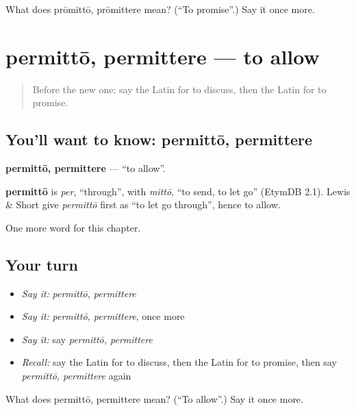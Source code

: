 \begin{tcolorbox}[breakable,colback=teal!4,colframe=teal!35!black,title={Before you move on}]
What does prōmittō, prōmittere mean? (\textquotedblleft{}To promise\textquotedblright{}.) Say it once more.
\end{tcolorbox}
\section[permittō, permittere]{permittō, permittere — to allow}

\label{lesson:LA-C166-permitto}



\begin{quote}
Before the new one: say the Latin for to discuss, then the Latin for to promise.
\end{quote}

\subsection*{You'll want to know: permittō, permittere}
\textbf{permittō, permittere} — \textquotedblleft{}to allow\textquotedblright{}.

\begin{cousinweb}
\textbf{permittō} is \emph{per}, \textquotedblleft{}through\textquotedblright{}, with \emph{mittō}, \textquotedblleft{}to send, to let go\textquotedblright{} (EtymDB 2.1). Lewis \& Short give \emph{permittō} first as \textquotedblleft{}to let go through\textquotedblright{}, hence to allow.
\end{cousinweb}

\begin{grammarlens}[title={What you've built}]
One more word for this chapter.
\end{grammarlens}

\subsection*{Your turn}
\begin{itemize}
\raggedright
  \item \emph{Say it:} \emph{permittō, permittere}
  \item \emph{Say it:} \emph{permittō, permittere}, once more
  \item \emph{Say it:} say \emph{permittō, permittere}
  \item \emph{Recall:} say the Latin for to discuss, then the Latin for to promise, then say \emph{permittō, permittere} again
\end{itemize}

\begin{tcolorbox}[breakable,colback=teal!4,colframe=teal!35!black,title={Before you move on}]
What does permittō, permittere mean? (\textquotedblleft{}To allow\textquotedblright{}.) Say it once more.
\end{tcolorbox}
